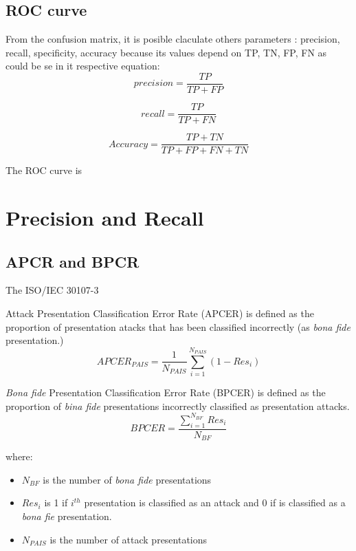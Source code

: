 \subsection{ROC curve}
From the confusion matrix, it is posible claculate others parameters \cite{Sokolova}: precision, recall, specificity, accuracy because its values depend on TP, TN, FP, FN as could be se in it respective equation:\\
\begin{equation}
  precision = \frac{TP}{TP + FP}
\end{equation}

\begin{equation}
  recall = \frac{TP}{TP + FN}
\end{equation}

\begin{equation}
  Accuracy = \frac{TP + TN}{TP + FP + FN + TN}
\end{equation}

The ROC curve is \\

\section{Precision and Recall}

\subsection{APCR and BPCR}
The ISO/IEC 30107-3 \cite{ISO}

Attack Presentation Classification Error Rate (APCER) is defined as the proportion of presentation atacks that has been classified incorrectly (as \textit{bona fide} presentation.)\\

\begin{equation}
  APCER_{PAIS} = \frac{1}{N_{PAIS}}\sum_{i=1}^{N_{PAIS}}(1 - Res_{i})
\end{equation}

\textit{Bona fide} Presentation Classification Error Rate (BPCER) is defined as the proportion of \textit{bina fide} presentations  incorrectly classified as presentation attacks.\\

\begin{equation}
  BPCER = \frac{\sum_{i=1}^{N_{BF}}Res_{i}}{N_{BF}}
\end{equation}


where: \begin{itemize}
\item $N_{BF}$ is the number of \textit{bona fide} presentations
\item $Res_{i}$ is 1 if $i^{th}$ presentation is classified as an attack and 0 if is classified as a \textit{bona fie} presentation.
\item $N_{PAIS}$ is the number of attack presentations
\end{itemize}
